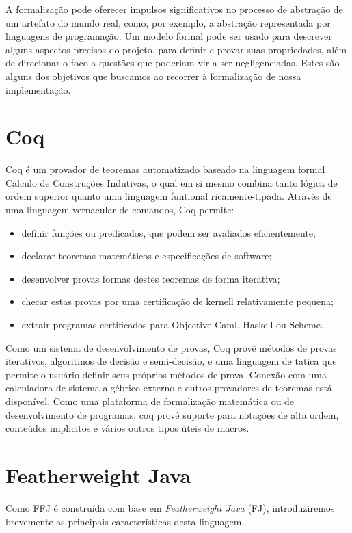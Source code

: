 A formalização pode oferecer impulsos significativos no processo de abstração de
um artefato do mundo real, como, por exemplo, a abstração representada por
linguagens de programação.  Um modelo formal pode ser usado para descrever
alguns aspectos precisos do projeto, para definir e provar suas propriedades,
além de direcionar o foco a questões que poderiam vir a ser negligenciadas.
Estes são alguns dos objetivos que buscamos ao recorrer à formalização de nossa
implementação.

    \section{Coq} Coq é um provador de teoremas automatizado  baseado na
    linguagem formal Calculo de Construções Indutivas\cite{coqart}, o qual em si
    mesmo combina tanto lógica de ordem superior quanto uma linguagem funtional
    ricamente-tipada. Através de uma linguagem vernacular de comandos, Coq
    permite: \begin{itemize} \item definir funções ou predicados, que podem ser
    avaliados eficientemente; \item declarar teoremas matemáticos e
    especificações de software; \item desenvolver provas formas destes teoremas
    de forma iterativa; \item checar estas provas por uma certificação de
    kernell relativamente pequena; \item extrair programas certificados para
    Objective Caml, Haskell ou Scheme.  \end{itemize} Como um sistema de
    desenvolvimento de provas, Coq provê métodos de provas iterativos,
    algoritmos de decisão e semi-decisão, e uma linguagem de tatica que permite
    o usuário definir seus próprios métodos de prova. Conexão com uma
    calculadora de sistema algébrico externo e outros provadores de teoremas
    está disponível.  Como uma plataforma de formalização matemática ou de
    desenvolvimento de programas, coq provê suporte para notações de alta ordem,
    conteúdos implicitos e vários outros tipos úteis de macros.

    \section{Featherweight Java}

    Como FFJ é construída com base em \textit{Featherweight Java} (FJ),
    introduziremos brevemente as principais características desta linguagem.

